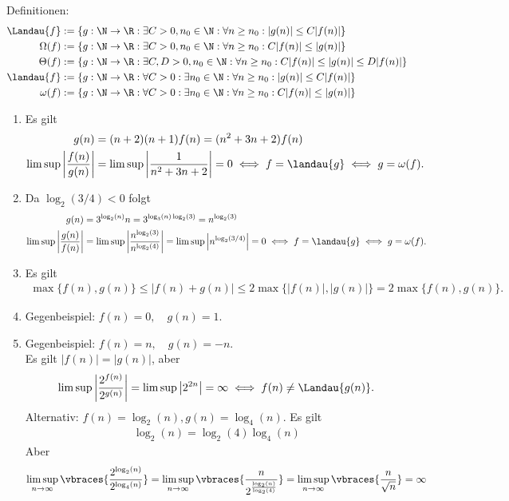 \begin{solution}
Definitionen:
\begin{align*}
  \Landau{f} &:= \{g: \N \to \R: \exists C > 0, n_0 \in \N: \forall n \geq n_0:
  |g(n)| \leq C|f(n)|\} \\
  \Omega(f) &:= \{g: \N \to \R: \exists C > 0, n_0 \in \N: \forall n \geq n_0:
  C|f(n)| \leq |g(n)|\} \\
  \Theta(f) &:= \{g: \N \to \R: \exists C, D > 0, n_0 \in \N: \forall n \geq n_0:
  C|f(n)| \leq |g(n)|\leq D|f(n)|\} \\
  \landau{f} &:= \{g: \N \to \R: \forall C > 0: \exists n_0 \in \N: \forall n \geq n_0:
  |g(n)| \leq C|f(n)|\} \\
  \omega(f) &:= \{g: \N \to \R: \forall C > 0: \exists n_0 \in \N: \forall n \geq n_0:
  C|f(n)| \leq |g(n)|\}
\end{align*}
\begin{enumerate}[label = (\alph*)]
  \item Es gilt
  \begin{align*}
    g(n) &= (n + 2)(n + 1)f(n) = (n^2 + 3n + 2)f(n) \\
    \limsup \left|\frac{f(n)}{g(n)}\right| &= \limsup \left|\frac{1}{n^2 + 3n + 2}\right|
    =0 \iff f = \landau{g} \iff g = \omega(f).
  \end{align*}

  \item
  Da $\log_2(3/4) < 0$ folgt
  \begin{align*}
    g(n) &= 3^{\log_2(n)}n = 3^{\log_3(n)\log_2(3)} = n^{\log_2(3)} \\
    \limsup \left|\frac{g(n)}{f(n)}\right| &= \limsup \left|\frac{n^{\log_2(3)}}{n^{\log_2(4)}}\right|
    = \limsup \left|n^{\log_2(3/4)}\right| = 0 \iff f = \landau{g} \iff g = \omega(f).
  \end{align*}
  \item Es gilt
  \begin{align*}
    \max\{f(n), g(n)\} \leq |f(n) + g(n)| \leq 2\max\{|f(n)|,|g(n)|\} = 2\max\{f(n),g(n)\}.
  \end{align*}
  \item Gegenbeispiel: $f(n) = 0, \quad g(n) = 1$.
  \item Gegenbeispiel: $f(n) = n, \quad g(n) = -n$. \\
  Es gilt $|f(n)| = |g(n)|$, aber
  \begin{align*}
    \limsup \left|\frac{2^{f(n)}}{2^{g(n)}}\right| = \limsup \left|2^{2n}\right| = \infty \iff f(n) \neq \Landau{g(n)}.
  \end{align*}
  Alternativ: $f(n) = \log_2(n), g(n) = \log_4(n)$. Es gilt
  \begin{align*}
    \log_2(n)
    =
    \log_2(4) \log_4(n)
  \end{align*}
  Aber
  \begin{align*}
    \limsup_{n  \to \infty} \vbraces{\frac{2^{\log_2(n)}}{2^{\log_4(n)}}}
    =
    \limsup_{n  \to \infty} \vbraces{\frac{n}{2^\frac{\log_2(n)}{\log_2(4)}}}
    =
    \limsup_{n  \to \infty} \vbraces{\frac{n}{\sqrt{n}}}
    =
    \infty
  \end{align*}


\end{enumerate}
\end{solution}
